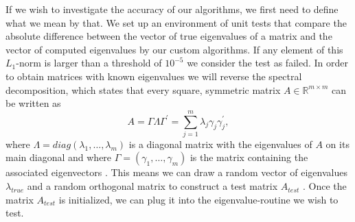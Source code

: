 \documentclass[12pt]{article}
\begin{document}
If we wish to investigate the accuracy of our algorithms, we first need to define what we mean by that. We set up an environment of unit tests that compare the absolute difference between the vector of true eigenvalues of a matrix and the vector of computed eigenvalues by our custom algorithms. If any element of this $L_1$-norm is larger than a threshold of $10^{-5}$ we consider the test as failed. In order to obtain matrices with known eigenvalues we will reverse the spectral decomposition, which states that every square, symmetric matrix $A \in \mathbb{R}^{m \times m}$ can be written as
\begin{equation}
\label{spectral-decomp}
A = \Gamma \Lambda \Gamma^{\prime} = \sum\limits_{j=1}^m \lambda_j \gamma_j \gamma^{\prime}_j,
\end{equation}
where $\Lambda = diag(\lambda_1, \dots, \lambda_m)$ is a diagonal matrix with the eigenvalues of $A$ on its main diagonal and where $\Gamma=(\gamma_1, \dots, \gamma_m)$ is the matrix containing the associated eigenvectors \citep{MVA}. This means we can draw a random vector of eigenvalues $\lambda_{true}$ and a random orthogonal matrix to construct a test matrix $A_{test}$ \citep{lapack}. Once the matrix $A_{test}$ is initialized, we can plug it into the eigenvalue-routine we wish to test.
\end{document}
